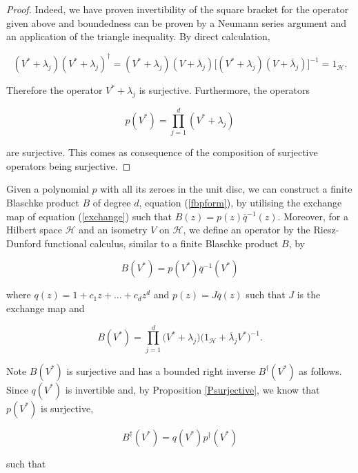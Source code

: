 \documentclass[10pt, reqno]{amsart}
\theoremstyle{definition}
\numberwithin{equation}{section}
\begin{document}
\begin{proof}
\noindent Indeed, we have proven invertibility of the square bracket for the operator given above and boundedness can be proven by a Neumann series argument and an application of the triangle inequality. By direct calculation,


$$(V^{*}+\lambda_{j})(V^{*}+\lambda_{j})^{\dagger}
    =(V^{*}+\lambda_{j})(V+\overline{\lambda}_{j})\bigg[(V^{*}+\lambda_{j})(V+\overline{\lambda}_{j})\bigg]^{-1} 
    = 1_{\mathcal{H}}.$$

\noindent Therefore the operator $V^{*}+\lambda_{j}$ is surjective. Furthermore, the operators

$$p(V^{*}) = \prod_{j=1}^{d}(V^{*}+\lambda_{j})$$

\noindent are surjective. This comes as consequence of the composition of surjective operators being surjective.\end{proof}

Given a polynomial $p$ with all its zeroes in the unit disc, we can construct a finite Blaschke product $B$ of degree $d$, equation (\ref{fbpform}), by utilising the exchange map of equation (\ref{exchange}) such that $B(z)=p(z)\overline{q}^{-1}(z)$. Moreover, for a Hilbert space $\mathcal{H}$ and an isometry $V$ on $\mathcal{H}$, we define an operator by the Riesz-Dunford functional calculus, similar to a finite Blaschke product $B$, by

\begin{equation}\label{blaschkeoperator}
B(V^{*}) = p(V^{*})\overline{q}^{-1}(V^{*})
\end{equation}

\noindent where $q(z) = 1+c_{1}z+\hdots+c_{d}z^{d}$ and $p(z)=J\overline{q}(z)$ such that $J$ is the exchange map and

\begin{equation}\label{blaschkeoperator1}
B(V^{*})=\prod_{j=1}^{d}\big(V^{*}+\lambda_{j}\big)\big(1_{\mathcal{H}}+\overline{\lambda}_{j}V^{*}\big)^{-1}.
\end{equation}

\noindent Note $B(V^{*})$ is surjective and has a bounded right inverse $B^{\dagger}(V^{*})$ as follows. Since $q(V^{*})$ is invertible and, by Proposition \ref{Psurjective}, we know that $p(V^{*})$ is surjective, 

\begin{equation}\label{blaschkesurjective}
B^{\dagger}(V^{*}) = q(V^{*})p^{\dagger}(V^{*})
\end{equation}

\noindent such that
\end{document}
